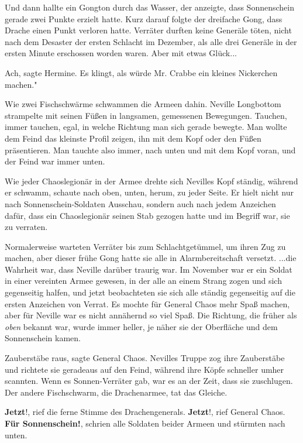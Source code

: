 Und dann hallte ein Gongton durch das Wasser, der anzeigte, dass Sonnenschein
gerade zwei Punkte erzielt hatte. Kurz darauf folgte der dreifache Gong, dass
Drache einen Punkt verloren hatte. Verräter durften keine Generäle töten, nicht
nach dem Desaster der ersten Schlacht im Dezember, als alle drei Generäle in der
ersten Minute erschossen worden waren. Aber mit etwas Glück...

\glqq Ach\grqq{}, sagte Hermine. \glqq Es klingt, als würde Mr. Crabbe ein
kleines Nickerchen machen."


Wie zwei Fischschwärme schwammen die Armeen dahin. Neville Longbottom strampelte
mit seinen Füßen in langsamen, gemessenen Bewegungen. Tauchen, immer tauchen,
egal, in welche Richtung man sich gerade bewegte. Man wollte dem Feind das
kleinste Profil zeigen, ihn mit dem Kopf oder den Füßen präsentieren. Man
tauchte also immer, nach unten und mit dem Kopf voran, und der Feind war immer
unten.

Wie jeder Chaoslegionär in der Armee drehte sich Nevilles Kopf ständig, während
er schwamm, schaute nach oben, unten, herum, zu jeder Seite. Er hielt nicht nur
nach Sonnenschein-Soldaten Ausschau, sondern auch nach jedem Anzeichen dafür,
dass ein Chaoslegionär seinen Stab gezogen hatte und im Begriff war, sie zu
verraten.

Normalerweise warteten Verräter bis zum Schlachtgetümmel, um ihren Zug zu
machen, aber dieser frühe Gong hatte sie alle in Alarmbereitschaft versetzt.
...die Wahrheit war, dass Neville darüber traurig war. Im November war er ein
Soldat in einer vereinten Armee gewesen, in der alle an einem Strang zogen und
sich gegenseitig halfen, und jetzt beobachteten sie sich alle ständig
gegenseitig auf die ersten Anzeichen von Verrat. Es mochte für General Chaos
mehr Spaß machen, aber für Neville war es nicht annähernd so viel Spaß. Die
Richtung, die früher als \emph{\glqq oben\grqq{} } bekannt war, wurde immer
heller, je näher sie der Oberfläche und dem Sonnenschein kamen.

\glqq Zauberstäbe raus\grqq{}, sagte General Chaos. Nevilles Truppe zog ihre
Zauberstäbe und richtete sie geradeaus auf den Feind, während ihre Köpfe
schneller umher scannten. Wenn es Sonnen-Verräter gab, war es an der Zeit, dass
sie zuschlugen. Der andere Fischschwarm, die Drachenarmee, tat das Gleiche.

\glqq \textbf{Jetzt}!\grqq{}, rief die ferne Stimme des Drachengenerals. \glqq
\textbf{Jetzt}!\grqq{}, rief General Chaos. \glqq \textbf{Für
Sonnenschein!}\grqq{}, schrien alle Soldaten beider Armeen und stürmten nach
unten.

